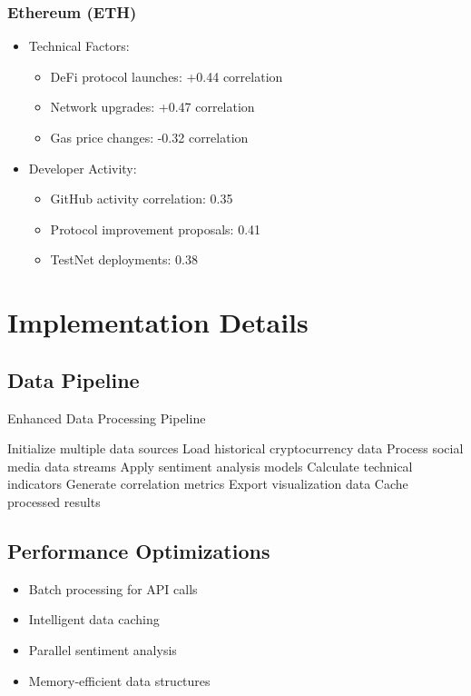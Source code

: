 \documentclass[12pt,a4paper]{report}
\begin{document}
\subsection{Ethereum (ETH)}
\begin{itemize}
    \item Technical Factors:
        \begin{itemize}
            \item DeFi protocol launches: +0.44 correlation
            \item Network upgrades: +0.47 correlation
            \item Gas price changes: -0.32 correlation
        \end{itemize}
    \item Developer Activity:
        \begin{itemize}
            \item GitHub activity correlation: 0.35
            \item Protocol improvement proposals: 0.41
            \item TestNet deployments: 0.38
        \end{itemize}
\end{itemize}

\chapter{Implementation Details}
\section{Data Pipeline}
\begin{algorithm}
    \caption{Enhanced Data Processing Pipeline}
    \begin{algorithmic}[1]
        \State Initialize multiple data sources
        \State Load historical cryptocurrency data
        \State Process social media data streams
        \State Apply sentiment analysis models
        \State Calculate technical indicators
        \State Generate correlation metrics
        \State Export visualization data
        \State Cache processed results
    \end{algorithmic}
\end{algorithm}

\section{Performance Optimizations}
\begin{itemize}
    \item Batch processing for API calls
    \item Intelligent data caching
    \item Parallel sentiment analysis
    \item Memory-efficient data structures
\end{itemize}
\end{document}
